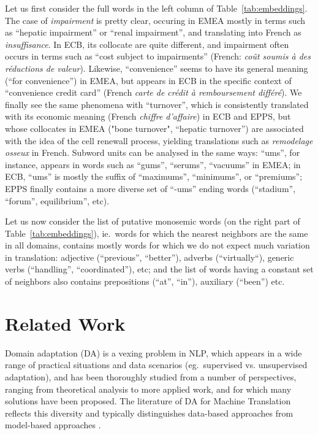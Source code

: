 \documentclass[a4paper]{article}
\begin{document}
Let us first consider the full words in the left column of Table~\ref{tab:embeddings}. The case of \emph{impairment} is pretty clear, occuring in EMEA mostly in terms such as ``hepatic impairment'' or ``renal impairment'', and translating into French as \textsl{insuffisance}. In ECB, its collocate are quite different, and impairment often occurs in terms such as ``cost subject to impairments'' (French: \emph{co\^ut soumis \`a des r\'eductions de valeur}). Likewise, ``convenience'' seems to have its general meaning (``for convenience'') in EMEA, but appears in ECB in the specific context of ``convenience credit card'' (French \textsl{carte de cr\' edit \`a remboursement diff\'er\'e}). We finally see the same phenomena with ``turnover'', which is consistently translated with its economic meaning (French \textsl{chiffre d'affaire}) in ECB and EPPS, but whose collocates in EMEA ("bone turnover", ``hepatic turnover'') are associated with the idea of the cell renewall process, yielding translations such as \textsl{remodelage osseux} in French. Subword units can be analysed in the same ways: ``ums'', for instance, appears in words such as ``gums'', ``serums'', ``vacuums''  in EMEA; in ECB, ``ums'' is mostly the suffix of ``maximums'', ``minimums'', or ``premiums''; EPPS finally contains a more diverse set of ``-ums'' ending words (``stadium'', ``forum'', equilibrium'', etc). 

Let us now consider the list of putative monosemic words (on the right part of Table~\ref{tab:embeddings}), ie.\ words for which the nearest neighbors are the same in all domains, contains mostly words for which we do not expect much variation in translation: adjective (``previous'', ``better''), adverbs (``virtually``), generic verbs (``handling'', ``coordinated''), etc; and the list of words having a constant set of neighbors also contains prepositions (``at'', ``in''), auxiliary (``been'') etc.  

\section{Related Work \label{sec:related_work}}

Domain adaptation (DA) is a vexing problem in NLP, which appears in a wide range of practical situations and data scenarios (eg.\ supervised vs. unsupervised adaptation), and  has been thoroughly  studied from a number of perspectives, ranging from theoretical analysis to more applied work, and for which many solutions have been proposed. The literature of DA for Machine Translation reflects this diversity and typically distinguishes data-based approaches from model-based approaches \cite{Chu2017comparison,Chu18asurvey}.
\end{document}
